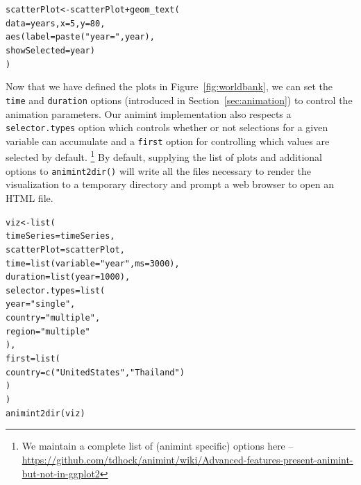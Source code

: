 \documentclass[12pt]{article}\usepackage[]{graphicx}\usepackage[]{color}
\makeatletter
\newcommand{\hlnum}[1]{\textcolor[rgb]{0,0,0}{#1}}%
\newcommand{\hlstr}[1]{\textcolor[rgb]{0.502,0,0}{#1}}%
\newcommand{\hlopt}[1]{\textcolor[rgb]{0,0,0}{#1}}%
\newcommand{\hlstd}[1]{\textcolor[rgb]{0,0,0}{#1}}%
\newcommand{\hlkwb}[1]{\textcolor[rgb]{0,0,0}{#1}}%
\newcommand{\hlkwc}[1]{\textcolor[rgb]{0,0,1}{#1}}%
\newcommand{\hlkwd}[1]{\textcolor[rgb]{0,0,0}{#1}}%
\newenvironment{kframe}{%
 \def\at@end@of@kframe{}%
 \ifinner\ifhmode%
  \def\at@end@of@kframe{\end{minipage}}%
  \begin{minipage}{\columnwidth}%
 \fi\fi%
 \def\FrameCommand##1{\hskip\@totalleftmargin \hskip-\fboxsep
 \colorbox{shadecolor}{##1}\hskip-\fboxsep
     \hskip-\linewidth \hskip-\@totalleftmargin \hskip\columnwidth}%
 \MakeFramed {\advance\hsize-\width
   \@totalleftmargin\z@ \linewidth\hsize
   \@setminipage}}%
 {\par\unskip\endMakeFramed%
 \at@end@of@kframe}
\newenvironment{knitrout}{}{} %
\makeatother
\begin{document}
\begin{knitrout}
\color{fgcolor}\begin{kframe}
\begin{alltt}
\hlstd{scatterPlot} \hlkwb{<-} \hlstd{scatterPlot} \hlopt{+} \hlkwd{geom_text}\hlstd{(}
  \hlkwc{data} \hlstd{= years,} \hlkwc{x} \hlstd{=} \hlnum{5}\hlstd{,} \hlkwc{y} \hlstd{=} \hlnum{80}\hlstd{,}
  \hlkwd{aes}\hlstd{(}\hlkwc{label} \hlstd{=} \hlkwd{paste}\hlstd{(}\hlstr{"year ="}\hlstd{, year),}
      \hlkwc{showSelected} \hlstd{= year)}
\hlstd{)}
\end{alltt}
\end{kframe}
\end{knitrout}

Now that we have defined the plots in Figure~\ref{fig:worldbank}, we can set
the \texttt{time} and \texttt{duration} options (introduced in 
Section~\ref{sec:animation}) to control the animation parameters. Our animint
implementation also respects a \texttt{selector.types} option which controls
whether or not selections for a given variable can accumulate and a 
\texttt{first} option for controlling which values are selected by default.
\footnote{We maintain a complete list of (animint specific) options here --
\url{https://github.com/tdhock/animint/wiki/Advanced-features-present-animint-but-not-in-ggplot2}} 
By default, supplying the list of plots and additional options to 
\texttt{animint2dir()} will write all the files necessary to render 
the visualization to a temporary directory and prompt a web browser to 
open an HTML file.

\begin{knitrout}
\color{fgcolor}\begin{kframe}
\begin{alltt}
\hlstd{viz} \hlkwb{<-} \hlkwd{list}\hlstd{(}
  \hlkwc{timeSeries} \hlstd{= timeSeries,}
  \hlkwc{scatterPlot} \hlstd{= scatterPlot,}
  \hlkwc{time} \hlstd{=} \hlkwd{list}\hlstd{(}\hlkwc{variable} \hlstd{=} \hlstr{"year"}\hlstd{,} \hlkwc{ms} \hlstd{=} \hlnum{3000}\hlstd{),}
  \hlkwc{duration} \hlstd{=} \hlkwd{list}\hlstd{(}\hlkwc{year} \hlstd{=} \hlnum{1000}\hlstd{),}
  \hlkwc{selector.types} \hlstd{=} \hlkwd{list}\hlstd{(}
    \hlkwc{year} \hlstd{=} \hlstr{"single"}\hlstd{,}
    \hlkwc{country} \hlstd{=} \hlstr{"multiple"}\hlstd{,}
    \hlkwc{region} \hlstd{=} \hlstr{"multiple"}
  \hlstd{),}
  \hlkwc{first} \hlstd{=} \hlkwd{list}\hlstd{(}
    \hlkwc{country} \hlstd{=} \hlkwd{c}\hlstd{(}\hlstr{"United States"}\hlstd{,} \hlstr{"Thailand"}\hlstd{)}
  \hlstd{)}
\hlstd{)}
\hlkwd{animint2dir}\hlstd{(viz)}
\end{alltt}
\end{kframe}
\end{knitrout}
\end{document}
